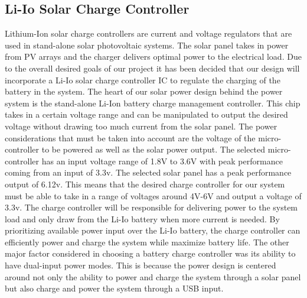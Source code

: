 \subsection{Li-Io Solar Charge Controller}
Lithium-Ion solar charge controllers are current and voltage regulators that are used in stand-alone solar photovoltaic systems. The solar panel takes in power from PV arrays and the charger delivers optimal power to the electrical load. Due to the overall desired goals of our project it has been decided that our design will incorporate a Li-Io solar charge controller IC to regulate the charging of the battery in the system. The heart of our solar power design behind the power system is the stand-alone Li-Ion battery charge
management controller. This chip takes in a certain voltage range and can be manipulated to output the desired voltage without drawing too much current from the solar panel. The power considerations that must be taken into account are the voltage of the micro-controller to be powered as well as the solar power output. The selected micro-controller has an input voltage range of 1.8V to 3.6V with peak performance coming from an input of 3.3v. The selected solar panel has a peak performance output of 6.12v. This means that the desired charge controller for our system must be able to take in a range of voltages around 4V-6V and output a voltage of 3.3v. The charge controller will be responsible for delivering power to the system load and only draw from the Li-Io battery when more current is needed. By prioritizing available power input over the Li-Io battery, the charge controller can efficiently power and charge the system while maximize battery life. The other major factor considered in choosing a battery charge controller was its ability to have dual-input power modes. This is because the power design is centered around not only the ability to power and charge the system through a solar panel but also charge and power the system through a USB input.

